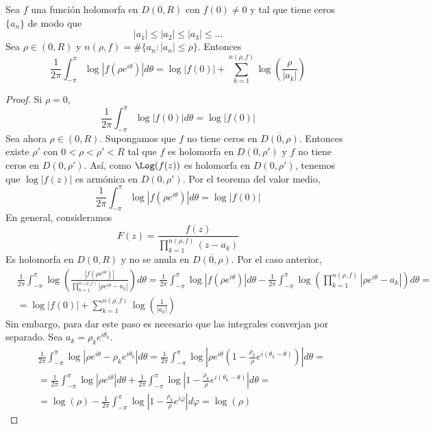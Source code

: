 \begin{theorem}
    Sea $f$ una función holomorfa en $D(0, R)$ con $f(0) \neq 0$ y tal que tiene ceros $\{a_n\}$ de modo que
    $$|a_1| \leq |a_2| \leq |a_3| \leq \dots$$
    Sea $\rho \in (0, R)$ y $n(\rho, f) = \#\{a_n : |a_n| \leq \rho\}$.
    Entonces
    $$\frac{1}{2\pi} \int_{-\pi}^\pi \log|f(\rho e^{i\theta})|d\theta = \log|f(0)| + \sum_{k=1}^{n(\rho, f)} \log\left(\frac{\rho}{|a_k|}\right)$$
\end{theorem}

\begin{proof}
    Si $\rho = 0$,
    $$\frac{1}{2\pi} \int_{-\pi}^\pi \log|f(0)|d\theta = \log|f(0)|$$
    Sea ahora $\rho \in (0, R)$.
    Supongamos que $f$ no tiene ceros en $\overline{D(0, \rho)}$.
    Entonces existe $\rho'$ con $0 < \rho < \rho' < R$ tal que $f$ es holomorfa en $D(0, \rho')$ y $f$ no tiene ceros en $D(0, \rho')$.
    Así, como $\Log(f(z))$ es holomorfa en $D(0, \rho')$, tenemos que $\log|f(z)|$ es armónica en $D(0, \rho')$.
    Por el teorema del valor medio,
    $$\frac{1}{2\pi} \int_{-\pi}^\pi \log|f(\rho e^{i\theta})|d\theta = \log|f(0)|$$
    En general, consideramos
    $$F(z) = \frac{f(z)}{\prod_{k=1}^{n(\rho, f)} (z-a_k)}$$
    Es holomorfa en $D(0, R)$ y no se anula en $\overline{D(0, \rho)}$.
    Por el caso anterior,
    \begin{align*}
         & \frac{1}{2\pi} \int_{-\pi}^\pi \log\left(\frac{|f(\rho e^{i\theta})|}{\prod_{k=1}^{n(\rho, f)} |\rho e^{i\theta} - a_k|}\right)d\theta = \frac{1}{2\pi} \int_{-\pi}^\pi \log|f(\rho e^{i\theta})|d\theta - \frac{1}{2\pi} \int_{-\pi}^\pi \log\left(\prod_{k=1}^{n(\rho, f)} |\rho e^{i\theta} - a_k|\right)d\theta = \\
         & = \log|f(0)| + \sum_{k=1}^{n(\rho, f)} \log\left(\frac{1}{|a_k|}\right)
    \end{align*}
    Sin embargo, para dar este paso es necesario que las integrales converjan por separado.
    Sea $a_k = \rho_ke^{i\theta_k}$.
    \begin{align*}
         & \frac{1}{2\pi} \int_{-\pi}^\pi \log|\rho e^{i\theta} - \rho_ke^{i\theta_k}|d\theta = \frac{1}{2\pi} \int_{-\pi}^\pi \log\left|\rho e^{i\theta}\left(1-\frac{\rho_k}{\rho}e^{i(\theta_k-\theta)}\right)\right|d\theta = \\
         & = \frac{1}{2\pi} \int_{-\pi}^\pi \log|\rho e^{i\theta}|d\theta + \frac{1}{2\pi} \int_{-\pi}^\pi \log\left|1-\frac{\rho_k}{\rho}e^{i(\theta_k-\theta)}\right|d\theta =                                                  \\
         & = \log(\rho) - \frac{1}{2\pi} \int_{-\pi}^\pi \log\left|1-\frac{\rho_k}{\rho}e^{i\varphi}\right|d\varphi = \log(\rho)
    \end{align*}
\end{proof}

